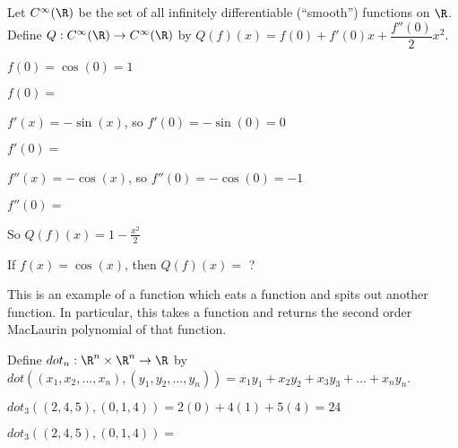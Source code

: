 \documentclass{ximera}
\begin{document}
\begin{question}
  Let $C^{\infty}(\R)$ be the set of all infinitely differentiable (``smooth'') functions on $\R$.  Define $Q: C^{\infty}(\R) \to C^{\infty}(\R)$ by $Q(f)(x) = f(0)+f'(0)x+\dfrac{f''(0)}{2}x^2$.
  \begin{solution}
    \begin{hint}
      \begin{question}
        \begin{solution}
          \begin{hint}
            $f(0)=\cos(0)=1$
          \end{hint}
          $f(0) = $ 
        \end{solution}
      \end{question}
      \begin{question}
        \begin{solution}
          \begin{hint}
            $f'(x) = -\sin(x)$, so $f'(0)=-\sin(0)=0$
          \end{hint}
          $f'(0) = $ 
        \end{solution}
      \end{question}
      \begin{question}
        \begin{solution}
          \begin{hint}
            $f''(x) = -\cos(x)$, so $f''(0)=-\cos(0)=-1$
          \end{hint}
          $f''(0) = $ 
        \end{solution}
      \end{question}
    \end{hint}
    \begin{hint}
      So $Q(f)(x) = 1-\frac{x^2}{2}$
    \end{hint}
    If $f(x) = \cos(x)$, then $Q(f)(x)=$ ?
  \end{solution}
  This is an example of a function which eats a function and spits out
  another function. In particular, this takes a function and returns
  the second order MacLaurin polynomial of that function.
\end{question}

\begin{question}
  Define $dot_n:\R^n \times \R^n \to \R$ by $dot((x_1,x_2,...,x_n),(y_1,y_2,...,y_n))=x_1y_1+x_2y_2+x_3y_3+...+x_ny_n$.  
  \begin{solution}
    \begin{hint}
      $dot_3((2,4,5),(0,1,4))= 2(0)+4(1)+5(4) = 24$
    \end{hint}
    $dot_3((2,4,5),(0,1,4))=$ 
  \end{solution}
\end{question}
\end{document}
